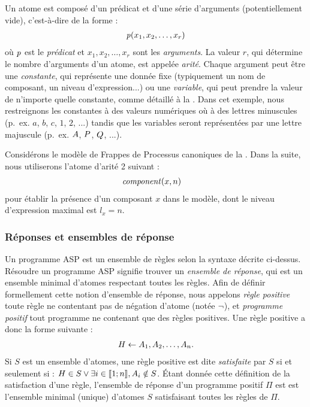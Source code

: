 Un atome est composé d'un prédicat et d'une série d'arguments (potentiellement vide),
c'est-à-dire de la forme :
\begin{align*}
  \mathit{p}(x_1, x_2, \dots, x_r)
\end{align*}
où $\mathit{p}$ est le \emph{prédicat} et $x_1, x_2, \dots, x_r$ sont les \emph{arguments}.
La valeur $r$, qui détermine le nombre d'arguments d'un atome, est appelée \emph{arité}.
Chaque argument peut être une \emph{constante}, qui représente une donnée fixe
(typiquement un nom de composant, un niveau d'expression...)
ou une \emph{variable}, qui peut prendre la valeur de n'importe quelle constante,
comme détaillé à la .
Dans cet exemple, nous restreignons les constantes à des valeurs numériques où à des
lettres minuscules (p.~ex. $a$, $b$, $c$, $1$, $2$, ...)
tandis que les variables seront représentées par une lettre majuscule
(p.~ex. $A$, $P$, $Q$, ...).

\begin{example}
  Considérons le modèle de Frappes de Processus canoniques de la .
  Dans la suite, nous utiliserons l'atome d'arité 2 suivant :
  \begin{align*}
    &\mathit{component}(x, n)
  \end{align*}
  pour établir la présence d'un composant $x$ dans le modèle,
  dont le niveau d'expression maximal est $l_x = n$.
\end{example}


\subsubsection{Réponses et ensembles de réponse}

Un programme ASP est un ensemble de règles selon la syntaxe décrite ci-dessus.
Résoudre un programme ASP signifie trouver un \emph{ensemble de réponse},
qui est un ensemble minimal d'atomes respectant toutes les règles.
Afin de définir formellement cette notion d'ensemble de réponse,
nous appelons \emph{règle positive} toute règle ne contentant pas de négation d'atome
(notée $\neg$), et \emph{programme positif} tout programme ne contenant que des
règles positives.
Une règle positive a donc la forme suivante :
\begin{align*}
  H \leftarrow A_1, A_2, \dots, A_n.
\end{align*}
Si $S$ est un ensemble d'atomes, une règle positive est dite \emph{satisfaite} par $S$
si et seulement si : $H \in S \vee \exists i \in \mathopen{\llbracket}1\mathclose{};n\mathclose{\rrbracket}, A_i \notin S$.
Étant donnée cette définition de la satisfaction d'une règle,
l'ensemble de réponse d'un programme positif $\Pi$ est
est l'ensemble minimal (unique) d'atomes $S$ satisfaisant toutes les règles de $\Pi$.

